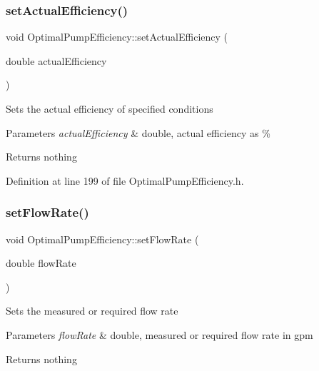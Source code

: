 \subsubsection{\texorpdfstring{set\+Actual\+Efficiency()}{setActualEfficiency()}\hspace{0.1cm}{\footnotesize\ttfamily [3/3]}}
{\footnotesize\ttfamily void Optimal\+Pump\+Efficiency\+::set\+Actual\+Efficiency (\begin{DoxyParamCaption}\item[{double}]{actual\+Efficiency }\end{DoxyParamCaption})\hspace{0.3cm}{\ttfamily [inline]}}

Sets the actual efficiency of specified conditions


\begin{DoxyParams}{Parameters}
{\em actual\+Efficiency} & double, actual efficiency as \%\\
\hline
\end{DoxyParams}
\begin{DoxyReturn}{Returns}
nothing 
\end{DoxyReturn}


Definition at line 199 of file Optimal\+Pump\+Efficiency.\+h.

\mbox{\label{class_optimal_pump_efficiency_a90067b57c559fd3274fb8d6e00f6221d}} 
\subsubsection{\texorpdfstring{set\+Flow\+Rate()}{setFlowRate()}\hspace{0.1cm}{\footnotesize\ttfamily [1/3]}}
{\footnotesize\ttfamily void Optimal\+Pump\+Efficiency\+::set\+Flow\+Rate (\begin{DoxyParamCaption}\item[{double}]{flow\+Rate }\end{DoxyParamCaption})\hspace{0.3cm}{\ttfamily [inline]}}

Sets the measured or required flow rate


\begin{DoxyParams}{Parameters}
{\em flow\+Rate} & double, measured or required flow rate in gpm\\
\hline
\end{DoxyParams}
\begin{DoxyReturn}{Returns}
nothing 
\end{DoxyReturn}


